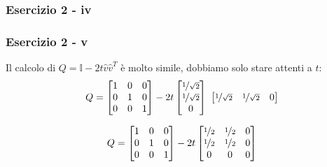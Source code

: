 \documentclass{beamer}
\newcommand{\fig}{figures} %
\begin{document}
\begin{frame}
\frametitle{Esercizio 2 - iv}
\begin{center}
\end{center}
\end{frame}

\begin{frame}
\frametitle{ Esercizio 2 - v}
    Il calcolo di $Q = \mathbb{I} - 2t\hat{v}\hat{v}^T$ \`e molto simile, dobbiamo solo stare attenti a $t$:
\begin{displaymath}
Q =  \begin{bmatrix}
                1 & 0 & 0\\
                0  & 1 & 0\\
                0 & 0 & 1
                \end{bmatrix}
    -2t\begin{bmatrix}
    \nicefrac{1}{\sqrt{2}} \\
    \nicefrac{1}{\sqrt{2}} \\
    0
    \end{bmatrix} 
    ~\begin{bmatrix}
    \nicefrac{1}{\sqrt{2}} & \nicefrac{1}{\sqrt{2}} & 0
    \end{bmatrix}
\end{displaymath}

\begin{displaymath}
Q =  \begin{bmatrix}
                1 & 0 & 0\\
                0  & 1 & 0\\
                0 & 0 & 1
                \end{bmatrix}
    -2t\begin{bmatrix}
                \nicefrac{1}{2} & \nicefrac{1}{2}  & 0\\
                \nicefrac{1}{2} & \nicefrac{1}{2}  & 0\\
                0 & 0 & 0
                \end{bmatrix}
\end{displaymath}


\end{frame}
\end{document}
